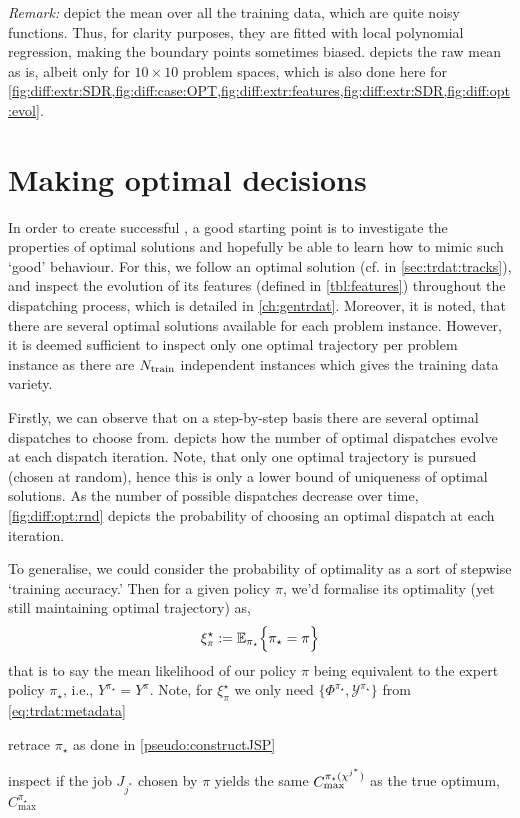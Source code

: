 \emph{Remark:}  
depict the mean over all the training data, which are quite noisy 
functions. Thus, for clarity purposes, they are fitted with local polynomial 
regression, making the boundary points sometimes biased. 
 depicts the raw mean as is, albeit only for $10\times10$ problem 
spaces, which is also done here for 
\cref{fig:diff:extr:SDR,fig:diff:case:OPT,fig:diff:extr:features,fig:diff:extr:SDR,fig:diff:opt:evol}.

\section{Making optimal decisions}
In order to create successful \dr, a good starting point is 
to investigate the properties of optimal solutions and hopefully be able to 
learn how to mimic such `good' behaviour. 
For this, we follow an optimal solution (cf. \PhiSet{\OPT} in 
\cref{sec:trdat:tracks}),
and inspect the evolution of its features  (defined in \cref{tbl:features}) 
throughout the dispatching process, which is detailed in \cref{ch:gentrdat}. 
Moreover, it is noted, that there are several optimal solutions available for 
each problem instance. However, it is deemed sufficient to inspect only one 
optimal trajectory per problem instance as there are $N_{\text{train}}$ 
independent instances which gives the training data variety. 

Firstly, we can observe that on a step-by-step basis there are several optimal 
dispatches to choose from.  depicts how the number of 
optimal dispatches evolve at each dispatch iteration. Note, that only one 
optimal trajectory is pursued (chosen at random), hence this is only a lower 
bound of uniqueness of optimal solutions.
As the number of possible dispatches decrease over time, 
\cref{fig:diff:opt:rnd} 
depicts the probability of choosing an optimal dispatch at each iteration. 

To generalise, we could consider the probability of optimality as a sort of 
stepwise `training accuracy.' Then for a given policy $\pi$, we'd formalise its 
optimality (yet still maintaining optimal trajectory) as, 
\begin{equation} \label{eq:tracc:opt}
    \xi^\star_{\pi} := \Exp[\pi_{\star}]{\pi_{\star} = \pi}
\end{equation}
that is to say the mean likelihood of our policy $\pi$ being equivalent to the 
expert policy $\pi_\star$, i.e., $Y^{\pi_\star}=Y^\pi$. Note, for 
$\xi^\star_\pi$ we 
only need $\{\Phi^{\pi_\star},\mathcal{Y}^{\pi_\star}\}$ from 
\cref{eq:trdat:metadata}
\begin{enumerate*}
    \item retrace $\pi_\star$ as done in \cref{pseudo:constructJSP}
    \item inspect if the job $J_{j^*}$ chosen by $\pi$ yields the same 
    $C_{\max}^{\pi_\star({\mathbf{\chi}}^{j^*})}$ as the true optimum, 
    $C_{\max}^{\pi_\star}$
\end{enumerate*}

